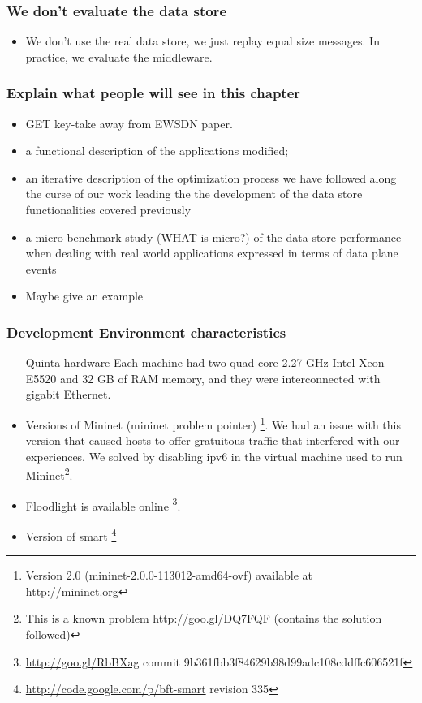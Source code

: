 \subsubsection{We don't evaluate the data store}
\begin{itemize}
\item We don't use the real data store, we just replay equal size
  messages. In practice, we evaluate the middleware. 
\end{itemize}

\subsubsection{Explain what people will see in this chapter}
\begin{itemize}
\item GET key-take away from EWSDN paper. 
\item a functional description of the applications modified;
\item an iterative description of the optimization process we have
  followed along the curse of our work leading the the development of
  the data store functionalities covered previously
\item a micro benchmark study (WHAT is micro?) of the data store
  performance when dealing with real world applications expressed in
  terms of data plane events
\item Maybe give an example

\end{itemize}


\subsubsection{Development Environment characteristics}
\begin{itemize}
\item[Quinta hardware] Each machine had two quad-core 2.27 GHz Intel
  Xeon E5520 and 32 GB of RAM memory, and they were interconnected with gigabit Ethernet.
\item Versions of Mininet (mininet problem pointer) \footnote{Version
    2.0 (mininet-2.0.0-113012-amd64-ovf) available at
    \url{http://mininet.org}}. We had an issue with this version that
  caused hosts to offer gratuitous traffic that interfered with our
  experiences. We solved by disabling \gls{ipv6} in the virtual
  machine used to run Mininet\footnote{This is a known problem
      http://goo.gl/DQ7FQF
      (contains the solution followed)}. 
\item Floodlight is available online \footnote{\url{http://goo.gl/RbBXag} commit 9b361fbb3f84629b98d99adc108cddffc606521f}. 
\item Version of smart
  \footnote{\url{http://code.google.com/p/bft-smart} revision 335} 
\end{itemize}


